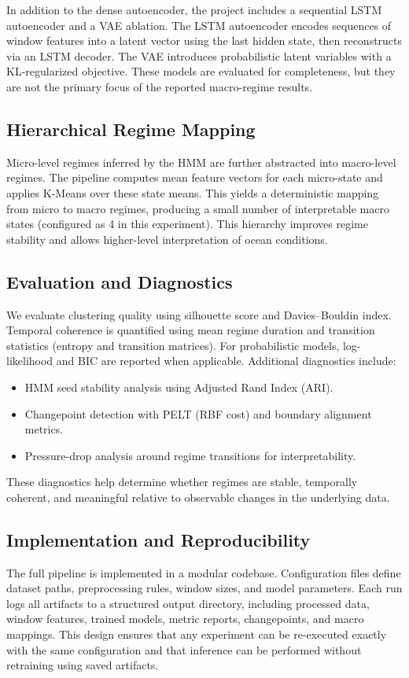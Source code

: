 \documentclass[conference]{IEEEtran}
\begin{document}
In addition to the dense autoencoder, the project includes a sequential LSTM autoencoder and a VAE ablation. The LSTM autoencoder encodes sequences of window features into a latent vector using the last hidden state, then reconstructs via an LSTM decoder. The VAE introduces probabilistic latent variables with a KL-regularized objective. These models are evaluated for completeness, but they are not the primary focus of the reported macro-regime results.

\subsection{Hierarchical Regime Mapping}
Micro-level regimes inferred by the HMM are further abstracted into macro-level regimes. The pipeline computes mean feature vectors for each micro-state and applies K-Means over these state means. This yields a deterministic mapping from micro to macro regimes, producing a small number of interpretable macro states (configured as 4 in this experiment). This hierarchy improves regime stability and allows higher-level interpretation of ocean conditions.

\subsection{Evaluation and Diagnostics}
We evaluate clustering quality using silhouette score and Davies--Bouldin index. Temporal coherence is quantified using mean regime duration and transition statistics (entropy and transition matrices). For probabilistic models, log-likelihood and BIC are reported when applicable. Additional diagnostics include:
\begin{itemize}
\item HMM seed stability analysis using Adjusted Rand Index (ARI).
\item Changepoint detection with PELT (RBF cost) and boundary alignment metrics.
\item Pressure-drop analysis around regime transitions for interpretability.
\end{itemize}
These diagnostics help determine whether regimes are stable, temporally coherent, and meaningful relative to observable changes in the underlying data.

\subsection{Implementation and Reproducibility}
The full pipeline is implemented in a modular codebase. Configuration files define dataset paths, preprocessing rules, window sizes, and model parameters. Each run logs all artifacts to a structured output directory, including processed data, window features, trained models, metric reports, changepoints, and macro mappings. This design ensures that any experiment can be re-executed exactly with the same configuration and that inference can be performed without retraining using saved artifacts.
\end{document}
